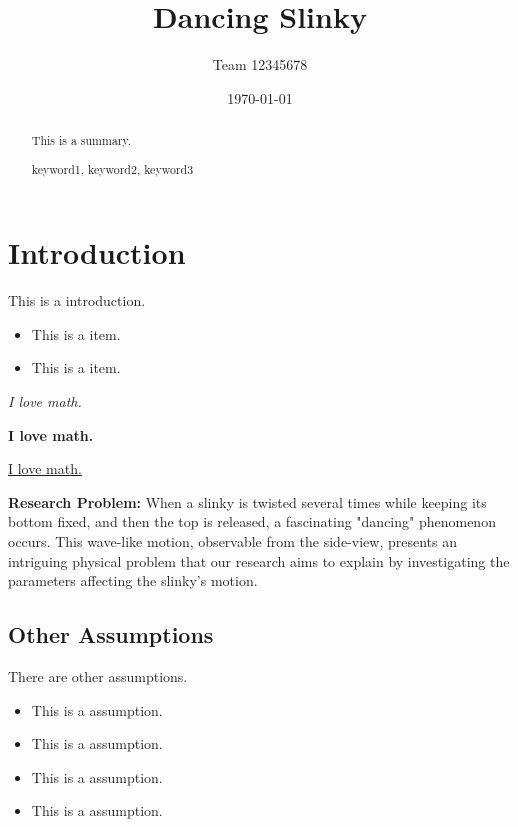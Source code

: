 \documentclass{mcmthesis}  %
\title{Dancing Slinky}  %
\author{\small Team 12345678}  %
\date{\today}  %
\begin{document}
\begin{abstract}  %
This is a summary.
\begin{keywords}  %
keyword1, keyword2, keyword3
\end{keywords}  %
\end{abstract}  %
\maketitle  %

\tableofcontents  %


\newpage  %
\section{Introduction}  %

This is a introduction.

\begin{itemize}  %
\item This is a item.
\item This is a item.
\end{itemize}  %

\textit{I love math.}  %

\textbf{I love math.}  %

\underline{I love math.}  %

\textbf{Research Problem:} When a slinky is twisted several times while keeping its bottom fixed, and then the top is released, a fascinating "dancing" phenomenon occurs. This wave-like motion, observable from the side-view, presents an intriguing physical problem that our research aims to explain by investigating the parameters affecting the slinky's motion.

\subsection{Other Assumptions}  %
There are other assumptions.

\begin{itemize}  %
\item This is a assumption.
\item This is a assumption.
\item This is a assumption.
\item This is a assumption.
\end{itemize}  %
\end{document}

